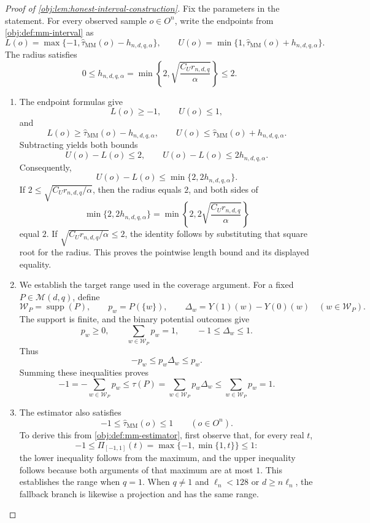 \begin{proof}[Proof of \cref{obj:lem:honest-interval-construction}]
Fix the parameters in the statement. For every observed sample \(o\in O^n\), write the endpoints from \cref{obj:def:mm-interval} as
\[
L(o)=\max\{-1,\widehat\tau_{\mathrm{MM}}(o)-h_{n,d,q,\alpha}\},
\qquad
U(o)=\min\{1,\widehat\tau_{\mathrm{MM}}(o)+h_{n,d,q,\alpha}\}.
\]
The radius satisfies
\[
0\le h_{n,d,q,\alpha}
=\min\left\{2,\sqrt{\frac{C_Ur_{n,d,q}}{\alpha}}\right\}
\le2.
\]

\begin{enumerate}
\item The endpoint formulas give
\[
L(o)\ge-1,\qquad U(o)\le1,
\]
and
\[
L(o)\ge\widehat\tau_{\mathrm{MM}}(o)-h_{n,d,q,\alpha},
\qquad
U(o)\le\widehat\tau_{\mathrm{MM}}(o)+h_{n,d,q,\alpha}.
\]
Subtracting yields both bounds
\[
U(o)-L(o)\le2,
\qquad
U(o)-L(o)\le2h_{n,d,q,\alpha}.
\]
Consequently,
\[
U(o)-L(o)\le\min\{2,2h_{n,d,q,\alpha}\}.
\]
If \(2\le\sqrt{C_Ur_{n,d,q}/\alpha}\), then the radius equals \(2\), and both sides of
\[
\min\{2,2h_{n,d,q,\alpha}\}
=
\min\left\{2,2\sqrt{\frac{C_Ur_{n,d,q}}{\alpha}}\right\}
\]
equal \(2\). If \(\sqrt{C_Ur_{n,d,q}/\alpha}\le2\), the identity follows by substituting that square root for the radius. This proves the pointwise length bound and its displayed equality.

\item We establish the target range used in the coverage argument. For a fixed \(P\in\mathcal M(d,q)\), define
\[
\mathcal W_P=\operatorname{supp}(P),
\qquad
p_w=P(\{w\}),
\qquad
\Delta_w=Y(1)(w)-Y(0)(w)
\quad(w\in\mathcal W_P).
\]
The support is finite, and the binary potential outcomes give
\[
p_w\ge0,\qquad
\sum_{w\in\mathcal W_P}p_w=1,
\qquad
-1\le\Delta_w\le1.
\]
Thus
\[
-p_w\le p_w\Delta_w\le p_w.
\]
Summing these inequalities proves
\[
-1
=-\sum_{w\in\mathcal W_P}p_w
\le
\tau(P)=\sum_{w\in\mathcal W_P}p_w\Delta_w
\le
\sum_{w\in\mathcal W_P}p_w
=1.
\]

\item The estimator also satisfies
\[
-1\le\widehat\tau_{\mathrm{MM}}(o)\le1
\qquad(o\in O^n).
\]
To derive this from \cref{obj:def:mm-estimator}, first observe that, for every real \(t\),
\[
-1\le\Pi_{[-1,1]}(t)=\max\{-1,\min\{1,t\}\}\le1:
\]
the lower inequality follows from the maximum, and the upper inequality follows because both arguments of that maximum are at most \(1\). This establishes the range when \(q=1\). When \(q\ne1\) and
\(\ell_n<128\) or \(d\ge n\ell_n\), the fallback branch is likewise a projection and has the same range.


\end{enumerate}
\end{proof}
